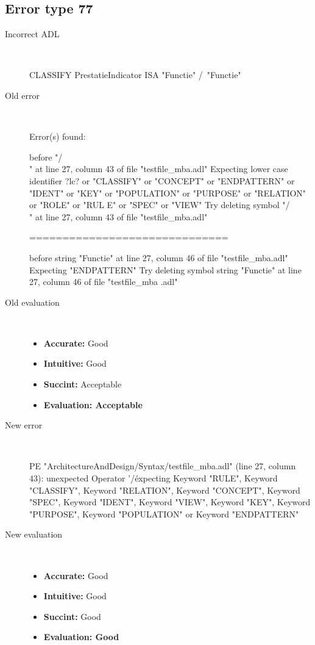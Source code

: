 \hrulefill

\subsection{Error type 77}
  \begin{description}
  \item[Incorrect ADL]~\\
\begin{adl}
CLASSIFY PrestatieIndicator ISA "Functie" /\ "Functie"\end{adl}
  \item[Old error]~\\
\begin{haskell}
Error(s) found:

before "/\\" at line 27, column 43 of file "testfile_mba.adl"
Expecting lower case identifier ?lc? or "CLASSIFY" or "CONCEPT" or "ENDPATTERN"
or "IDENT" or "KEY" or "POPULATION" or "PURPOSE" or "RELATION" or "ROLE" or "RUL
E" or "SPEC" or "VIEW"
Try deleting symbol "/\\" at line 27, column 43 of file "testfile_mba.adl"

==============================

before string "Functie" at line 27, column 46 of file "testfile_mba.adl"
Expecting "ENDPATTERN"
Try deleting symbol string "Functie" at line 27, column 46 of file "testfile_mba
.adl"

\end{haskell}
  \item[Old evaluation]~\\
    \begin{itemize}
    \item \textbf{Accurate:} Good
    \item \textbf{Intuitive:} Good
    \item \textbf{Succint:} Acceptable
    \item \textbf{Evaluation: Acceptable}
    \end{itemize}
  \item[New error]~\\
\begin{haskell}
PE "ArchitectureAndDesign/Syntax/testfile_mba.adl" (line 27, column 43):
unexpected Operator '/\'
expecting Keyword "RULE", Keyword "CLASSIFY", Keyword "RELATION", Keyword "CONCEPT", Keyword "SPEC", Keyword "IDENT", Keyword "VIEW", Keyword "KEY", Keyword "PURPOSE", Keyword "POPULATION" or Keyword "ENDPATTERN"
\end{haskell}
  \item[New evaluation]~\\
    \begin{itemize}
    \item \textbf{Accurate:} Good
    \item \textbf{Intuitive:} Good
    \item \textbf{Succint:} Good
    \item \textbf{Evaluation: Good
}
    \end{itemize}
  \end{description}

